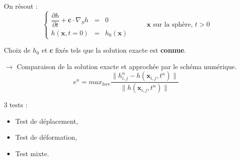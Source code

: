\documentclass[11pt]{beamer}
\begin{document}
\begin{frame}
On résout :
$$\left\{
\begin{array}{rcl}
\dfrac{\partial h}{\partial t} + \mathbf{c} \cdot \nabla_S h & = & 0 \\
h(\mathbf{x},t=0) & = & h_0 ( \mathbf{x} )
\end{array}
\right. \hspace{1cm} \mathbf{x} \text{ sur la sphère, } t>0$$

Choix de $h_0$ et $\mathbf{c}$ fixés tels que la solution exacte est \textbf{connue}.

$\rightarrow$ Comparaison de la solution exacte et approchée par le schéma numérique.
$$e^n = max_{\text{face}} \dfrac{ \| h^n_{i,j} - h(\mathbf{x}_{i,j}, t^n ) \| }{\| h(\mathbf{x}_{i,j}, t^n ) \|}$$

3 tests : 
\begin{itemize}
\item Test de déplacement,\\
\item Test de déformation,\\
\item Test mixte.
\end{itemize}

\end{frame}


\end{document}
